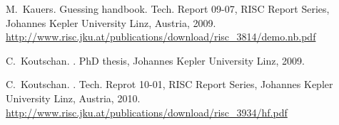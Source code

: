 \documentclass[10pt,a4paper]{article}
\begin{document}
\begin{thebibliography}{10}

M.~Kauers.
\newblock Guessing handbook.
\newblock Tech. Report 09-07, RISC Report Series, Johannes Kepler University Linz, Austria, 2009. \\
\href{http://www.risc.jku.at/publications/download/risc_3814/demo.nb.pdf}{http:/$\!$/www.risc.jku.at/publications/download/risc\_3814/demo.nb.pdf}

% 
% 
% 
C.~Koutschan.
.
\newblock PhD thesis, Johannes Kepler University Linz, 2009.

C.~Koutschan.
.
\newblock Tech. Reprot 10-01, RISC Report Series, Johannes Kepler University Linz, Austria, 2010. \\
\href{http://www.risc.jku.at/publications/download/risc_3934/hf.pdf}{http:/$\!$/www.risc.jku.at/publications/download/risc\_3934/hf.pdf}




\end{thebibliography}
\end{document}
